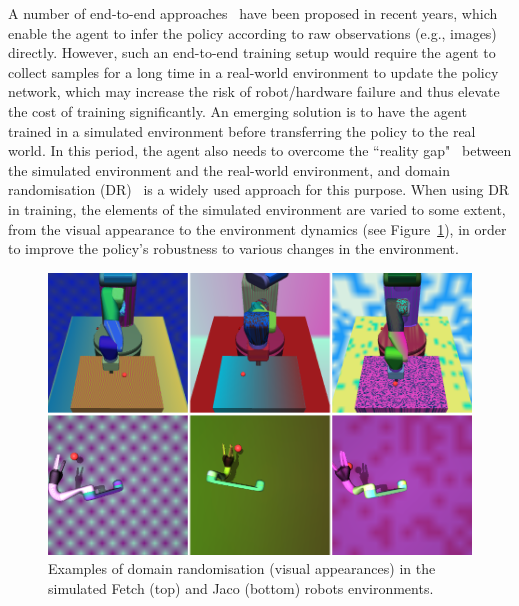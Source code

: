 A number of end-to-end approaches~\cite{gu2017deep,levine2016end,zhu2017target} have been proposed in recent years, which enable the agent to infer the policy according to raw observations (e.g., images) directly. However, such an end-to-end training setup would require the agent to collect samples for a long time in a real-world environment to update the policy network, which may increase the risk of robot/hardware failure and thus elevate the cost of training significantly. An emerging solution is to have the agent trained in a simulated environment before transferring the policy to the real world. In this period, the agent also needs to overcome the ``reality gap"~\cite{jakobi1995noise} between the simulated environment and the real-world environment, and domain randomisation (DR)~\cite{andrychowicz2018learning,james2017transferring,peng2018sim,sadeghi2017cad2rl,tobin2017domain} is a widely used approach for this purpose. When using DR in training, the elements of the simulated environment are varied to some extent, from the visual appearance to the environment dynamics (see Figure~\ref{fig:dr_example}), in order to improve the policy's robustness to various changes in the environment.
\begin{figure}[h!]
  \centering
  \includegraphics[width=\linewidth]{figures/chapter6/domain_random.png}
  \caption[Examples of visual domain randomisation in the simulated robot environments.]{Examples of domain randomisation (visual appearances) in the simulated Fetch (top) and Jaco (bottom) robots environments.}
  \label{fig:dr_example}
\end{figure}

